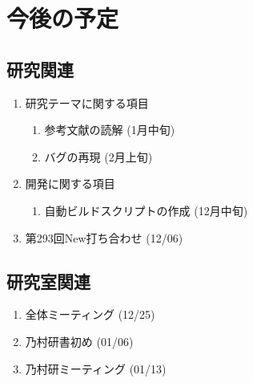 \documentclass[fleqn, 14pt]{extarticle}
\begin{document}
    \section{今後の予定}
    \label{sec-4}

    \subsection{研究関連}
    \label{sec-4-1}

    \begin{enumerate}

        \item 研究テーマに関する項目
            \hfill
            \begin{enumerate}

                \item 参考文献の読解
                    \hfill
                    (1月中旬)

                \item バグの再現
                    \hfill
                    (2月上旬)

            \end{enumerate}

        \item 開発に関する項目
            \hfill
            \begin{enumerate}

                \item 自動ビルドスクリプトの作成
                    \hfill
                    (12月中旬)

            \end{enumerate}

        \item 第293回New打ち合わせ
            \hfill
            \label{enum-7}
            (12/06)

    \end{enumerate}

    \subsection{研究室関連}
    \label{sec-4-2}

    \begin{enumerate}

        \item 全体ミーティング
            \hfill
            \label{enum-18}
            (12/25)

        \item 乃村研書初め
            \hfill
            \label{enum-18}
            (01/06)

        \item 乃村研ミーティング
            \hfill
            \label{enum-18}
            (01/13)

    \end{enumerate}
\end{document}
